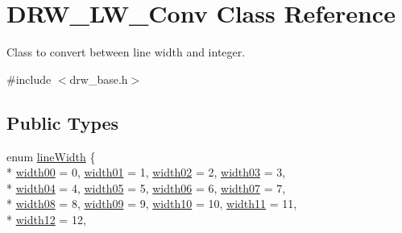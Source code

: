 \hypertarget{classDRW__LW__Conv}{\section{D\-R\-W\-\_\-\-L\-W\-\_\-\-Conv Class Reference}
\label{classDRW__LW__Conv}
}


Class to convert between line width and integer.  




{\ttfamily \#include $<$drw\-\_\-base.\-h$>$}

\subsection*{Public Types}
\begin{DoxyCompactItemize}
\item 
enum \hyperlink{classDRW__LW__Conv_aed68cbc3d8bdf7e20003dd2d970279b3}{line\-Width} \{ \\*
\hyperlink{classDRW__LW__Conv_aed68cbc3d8bdf7e20003dd2d970279b3a3007c229abfe3c9f018b2a881384aa17}{width00} = 0, 
\hyperlink{classDRW__LW__Conv_aed68cbc3d8bdf7e20003dd2d970279b3a27fc91eb33b8254bd0d0fbbb4b9430cc}{width01} = 1, 
\hyperlink{classDRW__LW__Conv_aed68cbc3d8bdf7e20003dd2d970279b3aa85257cc5f5a011103273232c4f90822}{width02} = 2, 
\hyperlink{classDRW__LW__Conv_aed68cbc3d8bdf7e20003dd2d970279b3ac0b97f9dfaf10daada26307bee172b82}{width03} = 3, 
\\*
\hyperlink{classDRW__LW__Conv_aed68cbc3d8bdf7e20003dd2d970279b3a5f4b9dfe971a491e4250eb79e80cb603}{width04} = 4, 
\hyperlink{classDRW__LW__Conv_aed68cbc3d8bdf7e20003dd2d970279b3acd3977a246f53b52046f215069e3a2bb}{width05} = 5, 
\hyperlink{classDRW__LW__Conv_aed68cbc3d8bdf7e20003dd2d970279b3a770acce0ba10abcb50783062e464201d}{width06} = 6, 
\hyperlink{classDRW__LW__Conv_aed68cbc3d8bdf7e20003dd2d970279b3a8c6d299834725dad1281e866f530dad2}{width07} = 7, 
\\*
\hyperlink{classDRW__LW__Conv_aed68cbc3d8bdf7e20003dd2d970279b3a8b4ebbd7b5fa5f360907e53d4c3ef7a4}{width08} = 8, 
\hyperlink{classDRW__LW__Conv_aed68cbc3d8bdf7e20003dd2d970279b3a9a8782efdcc8d0a6eb6400f05a9cb082}{width09} = 9, 
\hyperlink{classDRW__LW__Conv_aed68cbc3d8bdf7e20003dd2d970279b3a90804835ca340953071b6aaf6fea9f9c}{width10} = 10, 
\hyperlink{classDRW__LW__Conv_aed68cbc3d8bdf7e20003dd2d970279b3ad2ffa082a10ec1a0681f58db93ad4e92}{width11} = 11, 
\\*
\hyperlink{classDRW__LW__Conv_aed68cbc3d8bdf7e20003dd2d970279b3aff60246d9f43ab88f2a128a6755522df}{width12} = 12, 

\end{DoxyCompactItemize}
